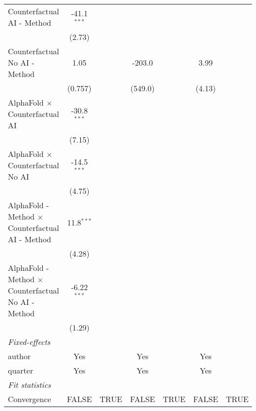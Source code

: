 \begin{tabular}{lcccccc}
   Counterfactual AI - Method                                 & -41.1$^{***}$ &      &              &      &         &   \\   
                                                              & (2.73)        &      &              &      &         &   \\   
   Counterfactual No AI - Method                              & 1.05          &      & -203.0       &      & 3.99    &   \\   
                                                              & (0.757)       &      & (549.0)      &      & (4.13)  &   \\   
   AlphaFold $\times$ Counterfactual AI                       & -30.8$^{***}$ &      &              &      &         &   \\   
                                                              & (7.15)        &      &              &      &         &   \\   
   AlphaFold $\times$ Counterfactual No AI                    & -14.5$^{***}$ &      &              &      &         &   \\   
                                                              & (4.75)        &      &              &      &         &   \\   
   AlphaFold - Method $\times$ Counterfactual AI - Method     & 11.8$^{***}$  &      &              &      &         &   \\   
                                                              & (4.28)        &      &              &      &         &   \\   
   AlphaFold - Method $\times$ Counterfactual No AI - Method  & -6.22$^{***}$ &      &              &      &         &   \\   
                                                              & (1.29)        &      &              &      &         &   \\   
   \midrule
   \emph{Fixed-effects}\\
   author                                                     & Yes           &      & Yes          &      & Yes     & \\  
   quarter                                                    & Yes           &      & Yes          &      & Yes     & \\  
   \midrule
   \emph{Fit statistics}\\
   Convergence                                                &FALSE          & TRUE & FALSE        & TRUE & FALSE   & TRUE\\  

\end{tabular}

